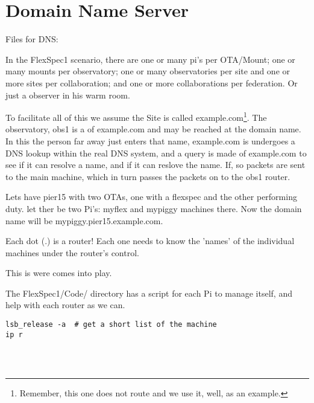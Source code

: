 \section{Domain Name Server}

Files for DNS:



In the FlexSpec1 scenario, there are one or many  pi's per OTA/Mount; one or many 
mounts per observatory; one or many observatories per site and one or more sites
per collaboration; and one or more collaborations per federation. Or just a observer
in his warm room.

To facilitate all of this we assume the Site is called
example.com\footnote{Remember, this one does not route and we use it,
  well, as an example.}. The observatory, obs1 is a  of
example.com and may be reached at the  domain
name. In this the person far away just enters that name, example.com
is undergoes a DNS lookup within the real DNS system, and a query is
made of example.com to see if it can resolve a name, and if it can
reslove the  name.  If, so packets are sent
to the main machine, which in turn passes the packets on to the
obs1 router.

Lets have pier15 with two OTAs, one with a flexspec and the other
performing  duty. let ther be two Pi's:  myflex and mypiggy
machines there. Now the domain name will be
mypiggy.pier15.example.com.

Each dot (.) is a router! Each one needs to know the 'names' of the
individual machines under the router's control.

This is were  comes into play.

The FlexSpec1/Code/ directory has a script for each Pi to manage itself,
and help with each router as we can.




\begingroup \fontsize{10pt}{10pt}
\selectfont
\begin{verbatim} 
lsb_release -a  # get a short list of the machine
ip r




\end{verbatim}
\endgroup


